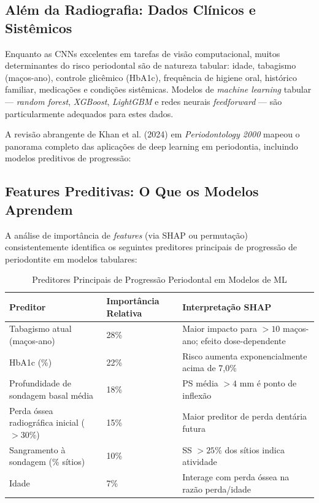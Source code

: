 \subsection{Além da Radiografia: Dados Clínicos e Sistêmicos}

Enquanto as CNNs excelentes em tarefas de visão computacional, muitos determinantes do risco periodontal são de natureza tabular: idade, tabagismo (maços-ano), controle glicêmico (HbA1c), frequência de higiene oral, histórico familiar, medicações e condições sistêmicas. Modelos de \textit{machine learning} tabular --- \textit{random forest}, \textit{XGBoost}, \textit{LightGBM} e redes neurais \textit{feedforward} --- são particularmente adequados para estes dados.

A revisão abrangente de Khan et al. (2024) em \textit{Periodontology 2000} mapeou o panorama completo das aplicações de deep learning em periodontia, incluindo modelos preditivos de progressão:


\subsection{Features Preditivas: O Que os Modelos Aprendem}

A análise de importância de \textit{features} (via SHAP ou permutação) consistentemente identifica os seguintes preditores principais de progressão de periodontite em modelos tabulares:

\begin{table}[H]
\centering
\caption{Preditores Principais de Progressão Periodontal em Modelos de ML}
\label{tab:preditores-periodontite}
\begin{tabular}{p{4cm}p{2cm}p{6cm}}
\toprule
\textbf{Preditor} & \textbf{Importância Relativa} & \textbf{Interpretação SHAP} \\
\midrule
Tabagismo atual (maços-ano) & 28\% & Maior impacto para $>10$ maços-ano; efeito dose-dependente \\
HbA1c (\%) & 22\% & Risco aumenta exponencialmente acima de 7,0\% \\
Profundidade de sondagem basal média & 18\% & PS média $>4$ mm é ponto de inflexão \\
Perda óssea radiográfica inicial ($>30\%$) & 15\% & Maior preditor de perda dentária futura \\
Sangramento à sondagem (\% sítios) & 10\% & SS $>25\%$ dos sítios indica atividade \\
Idade & 7\% & Interage com perda óssea na razão perda/idade \\
\bottomrule
\end{tabular}
\end{table}

